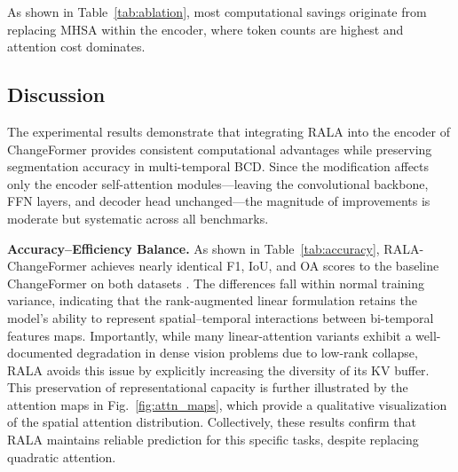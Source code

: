 \begin{table}[h!]
\caption{Ablation study isolating the encoder attention mechanism.}
\label{tab:ablation}
\centering
{}
\end{table}

\noindent As shown in Table~\ref{tab:ablation}, most computational savings originate from replacing MHSA within the encoder, where token counts are highest and attention cost dominates.

\subsection{Discussion}
\label{sec:discussion}

The experimental results demonstrate that integrating RALA into the encoder of ChangeFormer provides consistent computational advantages while preserving segmentation accuracy in multi-temporal BCD. Since the modification affects only the encoder self-attention modules—leaving the convolutional backbone, FFN layers, and decoder head unchanged—the magnitude of improvements is moderate but systematic across all benchmarks.

\noindent \textbf{Accuracy–Efficiency Balance.}
As shown in Table~\ref{tab:accuracy}, RALA-ChangeFormer achieves nearly identical F1, IoU, and OA scores to the baseline ChangeFormer on both datasets \cite{Zheng2020LEVIR,Shen2021DSIFN}. The differences fall within normal training variance, indicating that the rank-augmented linear formulation retains the model’s ability to represent spatial–temporal interactions between bi-temporal features maps. Importantly, while many linear-attention variants \cite{Choromanski2021Performer,Wang2020Linformer,Xiong2021Nystromformer} exhibit a well-documented degradation in dense vision problems due to low-rank collapse, RALA avoids this issue by explicitly increasing the diversity of its KV buffer. This preservation of representational capacity is further illustrated by the attention maps in Fig.~\ref{fig:attn_maps}, which provide a qualitative visualization of the spatial attention distribution. Collectively, these results confirm that RALA maintains reliable prediction for this specific tasks, despite replacing quadratic attention.

